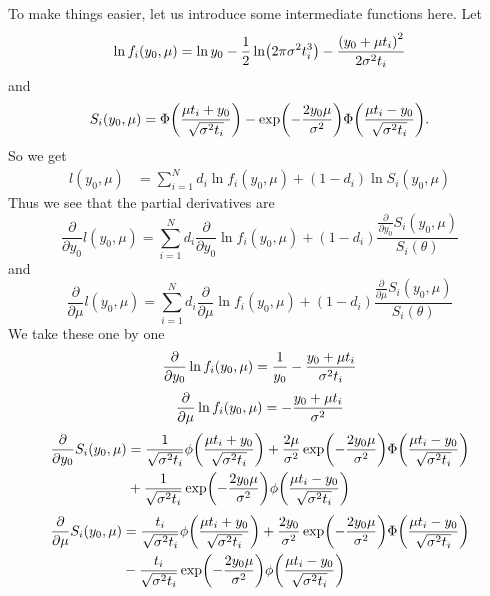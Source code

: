To make things easier, let us introduce some intermediate functions here. Let
\begin{equation}
\ln{f_i}(y_0, \mu)=\ln y_0-\frac{1}{2}\ln\p*{2\pi\sigma^2\ti^3}-\frac{\p*{y_0+\mu\ti}^2}{2\sigma^2\ti}
\end{equation}
and
\begin{equation}
S_i(y_0, \mu)=\Phi\p*{\frac{\mu\ti+y_0}{\sqrt{\sigma^2\ti}}}-\exp\p*{-\frac{2y_0\mu}{\sigma^2}}\Phi\p*{\frac{\mu\ti-y_0}{\sqrt{\sigma^2\ti}}}.
\end{equation}
So we get
\begin{align}
    l(y_0, \mu)&=\sum_{i=1}^Nd_i \ln{f_i}(y_0, \mu)+(1-d_i)\ln{S_i(y_0, \mu)}
\end{align}
Thus we see that the partial derivatives are
\begin{equation}
    \frac{\partial}{\partial y_0}l(y_0, \mu)=\sum_{i=1}^Nd_i \frac{\partial}{\partial y_0}\ln{f_i}(y_0, \mu)+(1-d_i)\frac{\frac{\partial}{\partial y_0}S_i(y_0, \mu)}{S_i(\theta)}
\end{equation}
and
\begin{equation}
    \frac{\partial}{\partial \mu}l(y_0, \mu)=\sum_{i=1}^Nd_i \frac{\partial}{\partial \mu}\ln{f_i}(y_0, \mu)+(1-d_i)\frac{\frac{\partial}{\partial \mu}S_i(y_0, \mu)}{S_i(\theta)}
\end{equation}
We take these one by one
\begin{equation}
    \frac{\partial}{\partial y_0}\ln{f_i}(y_0, \mu)=\frac{1}{y_0}-\frac{y_0+\mu t_{i}}{\sigma^2t_{i}}
\end{equation}
\begin{equation}
    \frac{\partial}{\partial \mu}\ln{f_i}(y_0, \mu)=-\frac{y_0+\mu t_{i}}{\sigma^2}
\end{equation}
\begin{align}
\begin{split}
    \frac{\partial}{\partial y_0}S_i(y_0, \mu)&=\frac{1}{\sqrt{\sigma^2\ti}}\phi\p*{\frac{\mu\ti+y_0}{\sqrt{\sigma^2\ti}}}+\frac{2\mu}{\sigma^2}\exp\p*{-\frac{2y_0\mu}{\sigma^2}}\Phi\p*{\frac{\mu\ti-y_0}{\sqrt{\sigma^2\ti}}} \\
    &+
    \frac{1}{\sqrt{\sigma^2\ti}}\exp\p*{-\frac{2y_0\mu}{\sigma^2}}\phi\p*{\frac{\mu\ti-y_0}{\sqrt{\sigma^2\ti}}}
\end{split}
\end{align}
\begin{align}
\begin{split}
    \frac{\partial}{\partial \mu}S_i(y_0, \mu)&=\frac{\ti}{\sqrt{\sigma^2\ti}}\phi\p*{\frac{\mu\ti+y_0}{\sqrt{\sigma^2\ti}}}+\frac{2y_0}{\sigma^2}\exp\p*{-\frac{2y_0\mu}{\sigma^2}}\Phi\p*{\frac{\mu\ti-y_0}{\sqrt{\sigma^2\ti}}} \\
    &-
    \frac{\ti}{\sqrt{\sigma^2\ti}}\exp\p*{-\frac{2y_0\mu}{\sigma^2}}\phi\p*{\frac{\mu\ti-y_0}{\sqrt{\sigma^2\ti}}}
\end{split}
\end{align}
